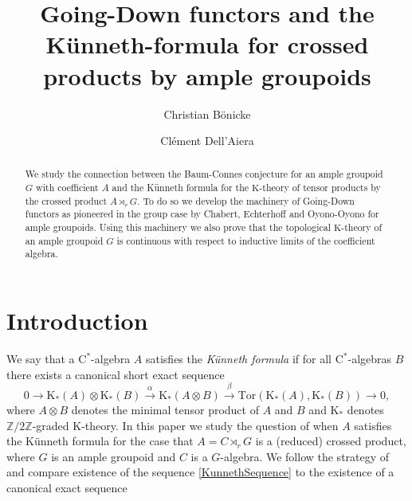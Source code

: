 \documentclass[reqno,oneside,a4paper,11pt]{amsart}
\title[Going-Down functors and the K\"unneth-formula]{\texorpdfstring{Going-Down functors and the Künneth-formula for crossed products by ample groupoids}{Going-Down functors and the Künneth-formula for crossed products by ample groupoids}}
\author{Christian B\"onicke}
\author{Clément Dell'Aiera}
\theoremstyle{theorem}
\theoremstyle{definition}
\newcommand{\K}{\mathrm K}
\newcommand{\ZZ}{\mathbb Z}
\begin{document}
	\maketitle
	\begin{abstract}
		We study the connection between the Baum-Connes conjecture for an ample groupoid $G$ with coefficient $A$ and the Künneth formula for the $\K$-theory of tensor products by the crossed product $A\rtimes_r G$. To do so we develop the machinery of Going-Down functors as pioneered in the group case by Chabert, Echterhoff and Oyono-Oyono for ample groupoids. Using this machinery we also prove that the topological $\K$-theory of an ample groupoid $G$ is continuous with respect to inductive limits of the coefficient algebra.
	\end{abstract}
	\section{Introduction}
	We say that a $\mathrm{C}^*$-algebra $A$ satisfies the \textit{Künneth formula} if for all $\mathrm{C}^*$-algebras $B$ there exists a canonical short exact sequence
	\begin{equation} \label{KunnethSequence}	
0\longrightarrow \K_*(A)\otimes \K_*(B)\stackrel{\alpha}{\longrightarrow}\K_*(A\otimes B)\stackrel{\beta}{\longrightarrow}\mathrm{Tor}(\K_*(A),\K_*(B))\longrightarrow 0,
	\end{equation}
	where $A\otimes B$ denotes the minimal tensor product of $A$ and $B$ and $\K_*$ denotes $\ZZ /2\ZZ$-graded $\K$-theory. In this paper we study the question of when $A$ satisfies the Künneth formula for the case that $A=C\rtimes_r G$ is a (reduced) crossed product, where $G$ is an ample groupoid and $C$ is a $G$-algebra.
	We follow the strategy of \cite{CEO} and compare existence of the sequence \ref{KunnethSequence} to the existence of a canonical exact sequence
\end{document}
